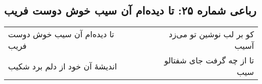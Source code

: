 \begin{center}
\section*{رباعی شماره ۲۵: تا دیده‌ام آن سیب خوش دوست فریب}
\label{sec:sh025}
\begin{longtable}{l p{0.5cm} r}
تا دیده‌ام آن سیب خوش دوست فریب
&&
کو بر لب نوشین تو می‌زد آسیب
\\
اندیشهٔ آن خود از دلم برد شکیب
&&
تا از چه گرفت جای شفتالو سیب
\\
\end{longtable}
\end{center}
